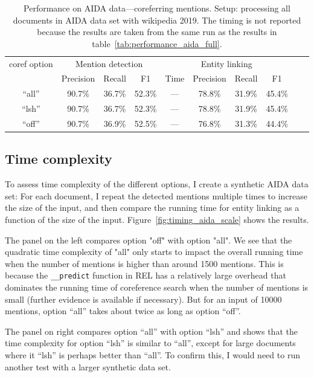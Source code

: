 \documentclass[a4paper,11pt]{article}
\numberwithin{equation}{section} %
\begin{document}
\begin{table}
 \begin{tabular}{c c c c c c c c c c}
\hline
 coref option & \multicolumn{3}{c}{Mention detection} & \multicolumn{4}{c}{Entity linking}  \\
        & Precision & Recall & F1 & Time & Precision & Recall & F1 \\
 \hline 
 ``all'' & 90.7\% & 36.7\% & 52.3\% & --- & 78.8\% & 31.9\% & 45.4\% \\  
 ``lsh'' & 90.7\% & 36.7\% & 52.3\% & --- & 78.8\% & 31.9\% & 45.4\% \\
 ``off'' & 90.7\% & 36.9\% & 52.5\% & --- & 76.8\% & 31.3\% & 44.4\% \\ 
\hline 
\end{tabular}
\caption{Performance on AIDA data---coreferring mentions. Setup: processing all documents in AIDA data set with wikipedia 2019. The timing is not reported because the results are taken from the same run as the results in table~\ref{tab:performance_aida_full}.}
\label{tab:performance_aida_corefs}
\end{table}


\subsection{Time complexity}
To assess time complexity of the different options, I create a synthetic AIDA data set: For each document, I repeat the detected mentions multiple times to increase the size of the input, and then compare the running time for entity linking as a function of the size of the input. Figure~\ref{fig:timing_aida_scale} shows the results.

The panel on the left compares option "off" with option "all". We see that the quadratic time complexity of "all" only starts to impact the overall running time when the number of mentions is higher than around 1500 mentions. This is because the \verb|__predict| function in REL has a relatively large overhead that dominates the running time of coreference search when the number of mentions is small (further evidence is available if necessary). But for an input of 10000 mentions, option ``all'' takes about twice as long as option ``off''. 

The panel on right compares option ``all'' with option ``lsh'' and shows that the time complexity for option ``lsh'' is similar to ``all'', except for large documents where it ``lsh'' is perhaps better than ``all''. To confirm this, I would need to run another test with a larger synthetic data set. 
\end{document}
